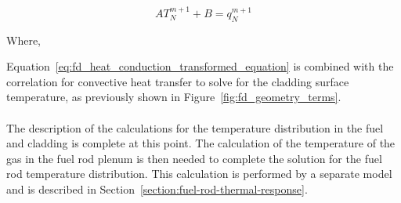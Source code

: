 \begin{equation}
    \label{eq:fd_heat_conduction_transformed_equation}
    AT_{N}^{m + 1} + B = q_{N}^{m + 1}
\end{equation}

Where,

Equation~\ref{eq:fd_heat_conduction_transformed_equation} is combined with the correlation for
convective heat transfer to solve for the cladding surface temperature, as previously shown in
Figure~\ref{fig:fd_geometry_terms}.
\\
\\
The description of the calculations for the temperature distribution in the fuel and cladding is
complete at this point. The calculation of the temperature of the gas in the fuel rod plenum is then
needed to complete the solution for the fuel rod temperature distribution. This calculation is
performed by a separate model and is described in Section~\ref{section:fuel-rod-thermal-response}.

